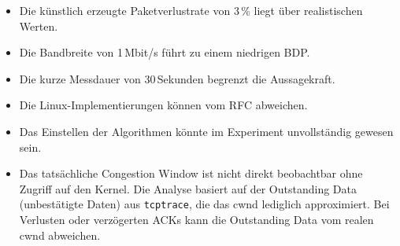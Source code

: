 \begin{itemize}
        \item Die künstlich erzeugte Paketverlustrate von 3\,\% liegt über realistischen Werten.
        \item Die Bandbreite von 1\,Mbit/s führt zu einem niedrigen BDP.
        \item Die kurze Messdauer von 30\,Sekunden begrenzt die Aussagekraft.
        \item Die Linux-Implementierungen können vom RFC abweichen.
        \item Das Einstellen der Algorithmen könnte im Experiment unvollständig gewesen sein.
        \item Das tatsächliche Congestion Window ist nicht direkt beobachtbar ohne Zugriff auf den Kernel.
        Die Analyse basiert auf der Outstanding Data (unbestätigte Daten) aus \texttt{tcptrace}, die das cwnd lediglich approximiert.
        Bei Verlusten oder verzögerten ACKs kann die Outstanding Data vom realen cwnd abweichen.
\end{itemize}
